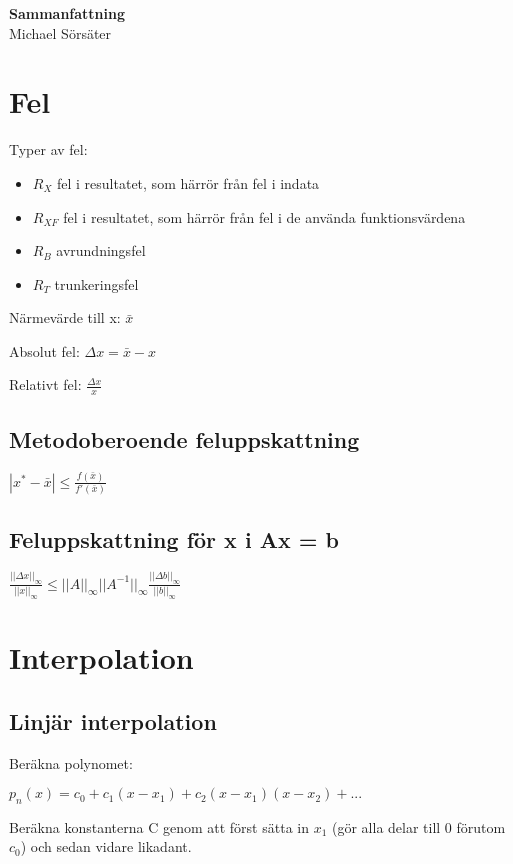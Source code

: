 \documentclass[12pt,a4paper]{article}
\begin{document}
\begin{center}
	\Huge
	\textbf{Sammanfattning}
	\\
	\large
	Michael Sörsäter
\end{center}

\section{Fel}
Typer av fel:
\begin{itemize}
\item{$R_X$ fel i resultatet, som härrör från fel i indata}
\item{$R_{XF}$ fel i resultatet, som härrör från fel i de använda funktionsvärdena}
\item{$R_B$ avrundningsfel}
\item{$R_T$ trunkeringsfel}
\end{itemize}

Närmevärde till x: $\bar{x}$

Absolut fel: $\Delta x = \bar{x}-x$

Relativt fel: $ \frac{\Delta x}{x}$

\subsection{Metodoberoende feluppskattning}
\large
$|x^{*}-\bar{x}| \leq \frac{f(\bar{x})}{f'(\bar{x})} $

\subsection{Feluppskattning för x i Ax = b}
\large
$\frac{||\Delta x||_\infty}{||x||_\infty} \leq ||A||_\infty ||A^{-1}||_\infty \frac{||\Delta b||_\infty}{||b||_\infty}$

\normalsize

\section{Interpolation}
\subsection{Linjär interpolation}
Beräkna polynomet:

\Large
$p_n(x) = c_0 + c_1(x-x_1) + c_2 (x-x_1)(x-x_2) + ...$

\normalsize
Beräkna konstanterna C genom att först sätta in $x_1$ (gör alla delar till 0 förutom $c_0$) och sedan vidare likadant.
\end{document}
